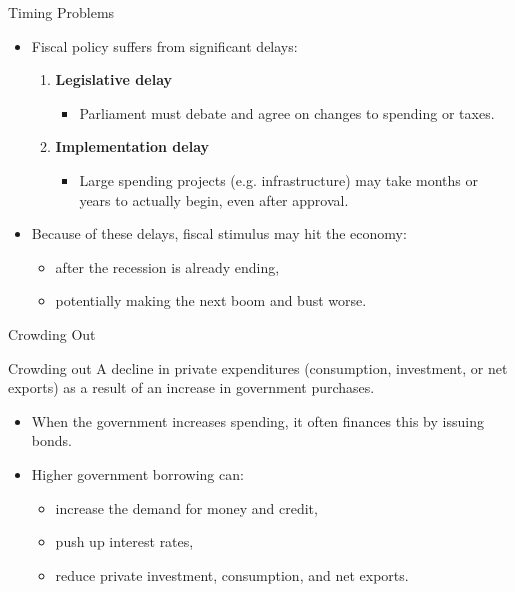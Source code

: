 \documentclass[aspectratio=169]{beamer}
\begin{document}
\begin{frame}{Timing Problems}
\transfade
\begin{itemize}
  \item Fiscal policy suffers from significant delays:
  \begin{enumerate}
    \item \textbf{Legislative delay}
      \begin{itemize}
        \item Parliament must debate and agree on changes to spending or taxes.
      \end{itemize}
    \item \textbf{Implementation delay}
      \begin{itemize}
        \item Large spending projects (e.g. infrastructure) may take months or years to actually begin, even after approval.
      \end{itemize}
  \end{enumerate}
  \item Because of these delays, fiscal stimulus may hit the economy:
  \begin{itemize}
    \item after the recession is already ending,
    \item potentially making the next boom and bust worse.
  \end{itemize}
\end{itemize}
\end{frame}

\begin{frame}{Crowding Out}
\transfade
\begin{block}{Crowding out}
A decline in private expenditures (consumption, investment, or net exports)
as a result of an increase in government purchases.
\end{block}
\begin{itemize}
  \item When the government increases spending, it often finances this by issuing bonds.
  \item Higher government borrowing can:
  \begin{itemize}
    \item increase the demand for money and credit,
    \item push up interest rates,
    \item reduce private investment, consumption, and net exports.
  \end{itemize}
\end{itemize}
\end{frame}
\end{document}
